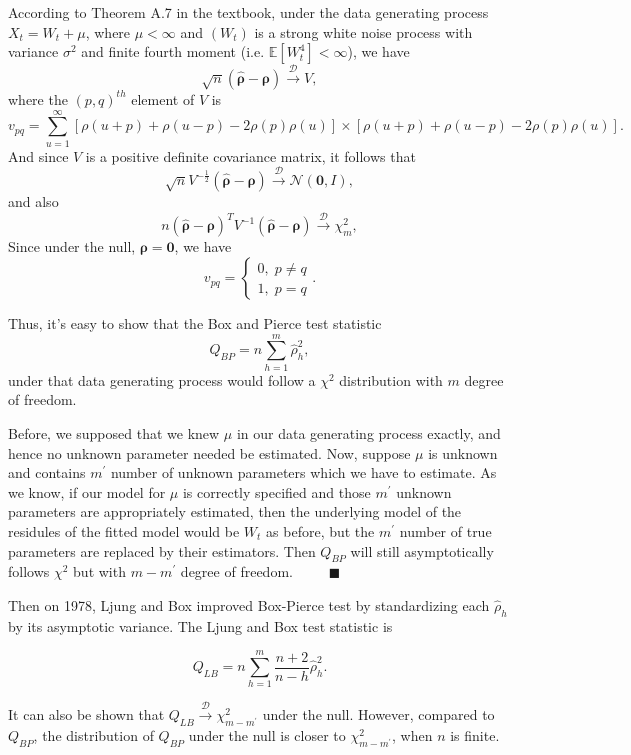 \documentclass[]{book}
\theoremstyle{definition}
\theoremstyle{definition}
\theoremstyle{definition}
\theoremstyle{remark}
\begin{document}
{According to Theorem A.7 in the textbook, under the data generating
process \(X_t = W_t + \mu\), where \(\mu < \infty\) and \((W_t)\) is a
strong white noise process with variance \(\sigma^2\) and finite fourth
moment (i.e. \(\mathbb{E} [W_t^4] < \infty\)), we have
\[\sqrt{n} \left(\mathbf{\hat{\rho}} - \mathbf{\rho}\right) \overset{\mathcal{D}}{\to} V,\]
where the \((p,q)^{th}\) element of \(V\) is
\[v_{pq} = \sum_{u=1}^{\infty}\left[ \rho(u+p) + \rho(u-p) - 2\rho(p)\rho(u) \right] \times \left[ \rho(u+p) + \rho(u-p) - 2\rho(p)\rho(u) \right].\]
And since \(V\) is a positive definite covariance matrix, it follows
that
\[\sqrt{n} V^{-\frac{1}{2}}\left(\mathbf{\hat{\rho}} - \mathbf{\rho}\right) \overset{\mathcal{D}}{\to} \mathcal{N}(\mathbf{0}, I),\]
and also
\[n \left(\mathbf{\hat{\rho}} - \mathbf{\rho}\right)^T V^{-1} \left(\mathbf{\hat{\rho}} - \mathbf{\rho}\right) \overset{\mathcal{D}}{\to} \chi^2_m,\]
Since under the null, \(\mathbf{\rho} = \mathbf{0}\), we have
\[v_{pq} = 
  \begin{cases}
0, \; p \neq q\\
1, \; p = q
\end{cases}
.\]

Thus, it's easy to show that the Box and Pierce test statistic
\[Q_{BP} = n\sum_{h =1}^m \hat{\rho}_h^2,\] under that data generating
process would follow a \(\chi^2\) distribution with \(m\) degree of
freedom.

Before, we supposed that we knew \(\mu\) in our data generating process
exactly, and hence no unknown parameter needed be estimated. Now,
suppose \(\mu\) is unknown and contains \(m^{\prime}\) number of unknown
parameters which we have to estimate. As we know, if our model for
\(\mu\) is correctly specified and those \(m^{\prime}\) unknown
parameters are appropriately estimated, then the underlying model of the
residules of the fitted model would be \(W_t\) as before, but the
\(m^{\prime}\) number of true parameters are replaced by their
estimators. Then \(Q_{BP}\) will still asymptotically follows \(\chi^2\)
but with \(m - m^{\prime}\) degree of freedom.
\(\;\;\;\;\;\;\;\; \blacksquare\)

Then on 1978, Ljung and Box improved Box-Pierce test by standardizing
each \(\hat{\rho}_h\) by its asymptotic variance. The Ljung and Box test
statistic is

\[Q_{LB} = n\sum_{h =1}^m \frac{n+2}{n-h}\hat{\rho}_h^2.\]

It can also be shown that
\(Q_{LB} \overset{\mathcal{D}}{\to} \chi^2_{m - m^{\prime}}\) under the
null. However, compared to \(Q_{BP}\), the distribution of \(Q_{BP}\)
under the null is closer to \(\chi^2_{m - m^{\prime}}\), when \(n\) is
finite.

}
\end{document}

